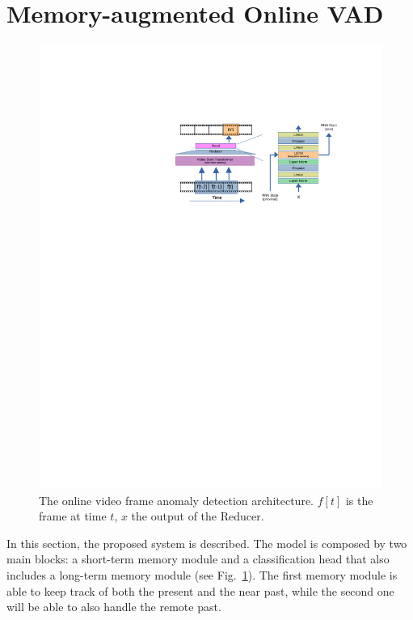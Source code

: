\section{Memory-augmented Online VAD}
\label{sec:theory}

\fboxsep=1mm%
\fboxrule=1pt%

\begin{figure}[!ht]
            \centerline{\includegraphics[trim=205 500 80 130, clip, width=0.8\linewidth]{images/arch.pdf}}
        \caption{The online video frame anomaly detection architecture. $f[t]$ is the frame at time $t$, $x$ the output of the Reducer. }
		\label{fig:arch}
\end{figure}

In this section, the proposed system is described.  
The model is composed by two main blocks: a short-term memory module and a classification head that also includes a long-term  memory module (see Fig.~\ref{fig:arch}). 
The first memory module is able to keep track of both the present and the near past, while the second one will be able to also handle the remote past.

